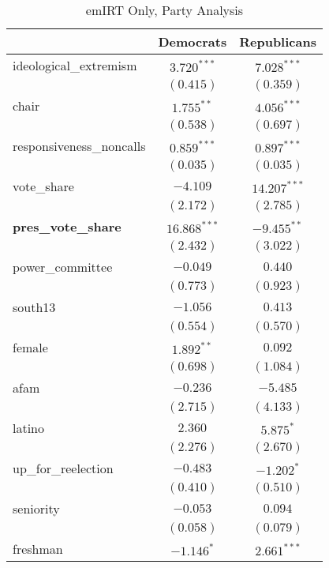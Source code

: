 \documentclass[12pt]{article}
\begin{document}
\begin{table}
	\begin{center}
    	\caption{emIRT Only, Party Analysis}
		\begin{tabular}{l c c }
			\hline
			& Democrats & Republicans \\
			\hline
			ideological\_extremism   & $3.720^{***}$  & $7.028^{***}$  \\
			& $(0.415)$      & $(0.359)$      \\
			chair                    & $1.755^{**}$   & $4.056^{***}$  \\
			& $(0.538)$      & $(0.697)$      \\
			responsiveness\_noncalls & $0.859^{***}$  & $0.897^{***}$  \\
			& $(0.035)$      & $(0.035)$      \\
			vote\_share              & $-4.109$       & $14.207^{***}$ \\
			& $(2.172)$      & $(2.785)$      \\
			\textbf{pres\_vote\_share}        & $16.868^{***}$ & $-9.455^{**}$  \\
			& $(2.432)$      & $(3.022)$      \\
			power\_committee         & $-0.049$       & $0.440$        \\
			& $(0.773)$      & $(0.923)$      \\
			south13                  & $-1.056$       & $0.413$        \\
			& $(0.554)$      & $(0.570)$      \\
			female                   & $1.892^{**}$   & $0.092$        \\
			& $(0.698)$      & $(1.084)$      \\
			afam                     & $-0.236$       & $-5.485$       \\
			& $(2.715)$      & $(4.133)$      \\
			latino                   & $2.360$        & $5.875^{*}$    \\
			& $(2.276)$      & $(2.670)$      \\
			up\_for\_reelection      & $-0.483$       & $-1.202^{*}$   \\
			& $(0.410)$      & $(0.510)$      \\
			seniority                & $-0.053$       & $0.094$        \\
			& $(0.058)$      & $(0.079)$      \\
			freshman                 & $-1.146^{*}$   & $2.661^{***}$  \\

\end{tabular}
\end{center}
\end{table}
\end{document}
